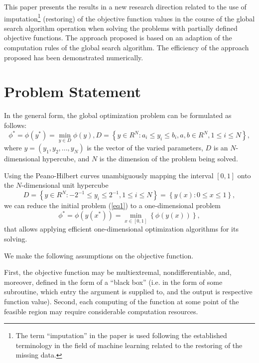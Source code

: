 \documentclass[runningheads]{llncs}
\begin{document}
This paper presents the results in a new research direction related to the use of imputation\footnote{The term ``imputation'' in the paper is used following the established terminology in the field of machine learning related to the restoring of the missing data.} (restoring) of the objective function values in the course of the global search algorithm operation when solving the problems with partially defined objective functions. The approach proposed is based on an adaption of the computation rules of the global search algorithm. The efficiency of the approach proposed has been demonstrated numerically.

\section{Problem Statement}

In the general form, the global optimization problem can be formulated as follows:
\begin{equation}\label{eq1} 
\phi^*=\phi(y^* )=\min_{y \in D} \phi(y), D=\left\{ y \in R^N: a_i \leq y_i \leq b_i, a,b \in R^N,1 \leq i \leq N \right\},
\end{equation}
where $y=(y_1,y_2,...,y_N)$ is the vector of the varied parameters, $D$ is an $N$-dimensional hypercube, and $N$ is the dimension of the problem being solved.

Using the Peano-Hilbert curves unambiguously mapping the interval $[0,1]$ onto the $N$-dimensional unit hypercube 
$$
D=\left\{ y \in R^N: -2^{-1} \leq y_i \leq 2^{-1}, 1 \leq i \leq N \right\} = \left\{ y(x): 0 \leq x \leq 1 \right\},
$$
we can reduce the initial problem (\ref{eq1}) to a one-dimensional problem
\begin{equation}\label{eq2} 
\phi^*=\phi(y(x^* ))=\min_{x \in [0,1]} \left\{ \phi(y(x)) \right\},
\end{equation}
that allows applying efficient one-dimensional optimization algorithms for its solving.

We make the following assumptions on the objective function. 

First, the objective function may be multiextremal, nondifferentiable, and, moreover, defined in the form of a ``black box'' (i.e. in the form of some subroutine, which entry the argument is supplied to, and the output is respective function value).
Second, each computing of the function at some point of the feasible region may require considerable computation resources.
\end{document}
